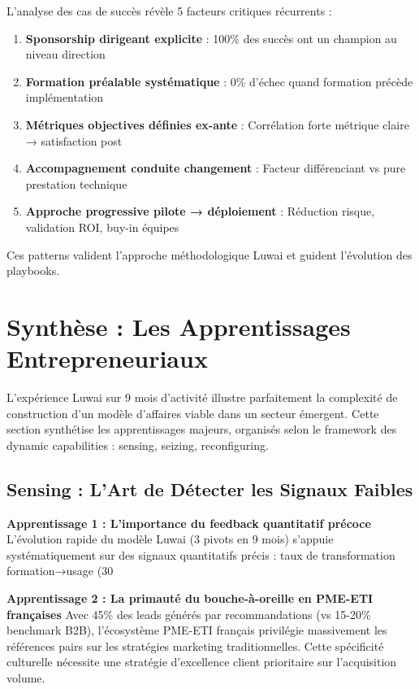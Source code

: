 L'analyse des cas de succès révèle 5 facteurs critiques récurrents :

\begin{enumerate}
    \item \textbf{Sponsorship dirigeant explicite} : 100\% des succès ont un champion au niveau direction
    \item \textbf{Formation préalable systématique} : 0\% d'échec quand formation précède implémentation
    \item \textbf{Métriques objectives définies ex-ante} : Corrélation forte métrique claire → satisfaction post
    \item \textbf{Accompagnement conduite changement} : Facteur différenciant vs pure prestation technique
    \item \textbf{Approche progressive pilote → déploiement} : Réduction risque, validation ROI, buy-in équipes
\end{enumerate}

Ces patterns valident l'approche méthodologique Luwai et guident l'évolution des playbooks.

\section{Synthèse : Les Apprentissages Entrepreneuriaux}

L'expérience Luwai sur 9 mois d'activité illustre parfaitement la complexité de construction d'un modèle d'affaires viable dans un secteur émergent. Cette section synthétise les apprentissages majeurs, organisés selon le framework des dynamic capabilities \cite{teece2007dynamic} : sensing, seizing, reconfiguring.

\subsection{Sensing : L'Art de Détecter les Signaux Faibles}

\textbf{Apprentissage 1 : L'importance du feedback quantitatif précoce}
L'évolution rapide du modèle Luwai (3 pivots en 9 mois) s'appuie systématiquement sur des signaux quantitatifs précis : taux de transformation formation→usage (30%

\textbf{Apprentissage 2 : La primauté du bouche-à-oreille en PME-ETI françaises}
Avec 45\% des leads générés par recommandations (vs 15-20\% benchmark B2B), l'écosystème PME-ETI français privilégie massivement les références pairs sur les stratégies marketing traditionnelles. Cette spécificité culturelle \cite{hofstede2001culture} nécessite une stratégie d'excellence client prioritaire sur l'acquisition volume.

